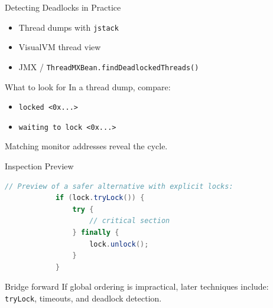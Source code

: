 \documentclass[aspectratio=169,11pt]{beamer}
\begin{document}
	\begin{frame}{Detecting Deadlocks in Practice}
		\begin{itemize}
			\item Thread dumps with \texttt{jstack}
			\item VisualVM thread view
			\item JMX / \texttt{ThreadMXBean.findDeadlockedThreads()}
		\end{itemize}
		
		\bigskip
		
		\begin{alertblock}{What to look for}
			In a thread dump, compare:
			\begin{itemize}
				\item \texttt{locked <0x...>}
				\item \texttt{waiting to lock <0x...>}
			\end{itemize}
			Matching monitor addresses reveal the cycle.
		\end{alertblock}
	\end{frame}
	
	\begin{frame}[fragile]{Inspection Preview}
		\begin{lstlisting}[language=Java]
			// Preview of a safer alternative with explicit locks:
			if (lock.tryLock()) {
				try {
					// critical section
				} finally {
					lock.unlock();
				}
			}
		\end{lstlisting}
		
		\vspace{0.3cm}
		
		\begin{alertblock}{Bridge forward}
			If global ordering is impractical, later techniques include:
			\texttt{tryLock}, timeouts, and deadlock detection.
		\end{alertblock}
	\end{frame}
	
\end{document}
